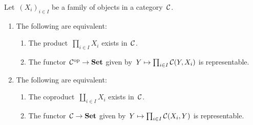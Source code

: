 \begin{lemma}
  \label{existence of coproducts}
  Let~$(X_i)_{i \in I}$ be a family of objects in a category~$\mathcal{C}$.
  \begin{enumerate}
    \item
      The following are equivalent:
      \begin{enumerate}
        \item
          The product~$\prod_{i \in I} X_i$ exists in~$\mathcal{C}$.
        \item
          The functor~$\mathcal{C}^{\mathrm{op}} \to \mathbf{Set}$ given by~$Y \mapsto \prod_{i \in I} \mathcal{C}(Y,X_i)$ is representable.
      \end{enumerate}
    \item
      \label{for coproducts}
      The following are equivalent:
      \begin{enumerate}
        \item
          The coproduct~$\coprod_{i \in I} X_i$ exists in~$\mathcal{C}$.
        \item
          The functor~$\mathcal{C} \to \mathbf{Set}$ given by~$Y \mapsto \prod_{i \in I} \mathcal{C}(X_i,Y)$ is representable.
      \end{enumerate}
  \end{enumerate}
\end{lemma}


